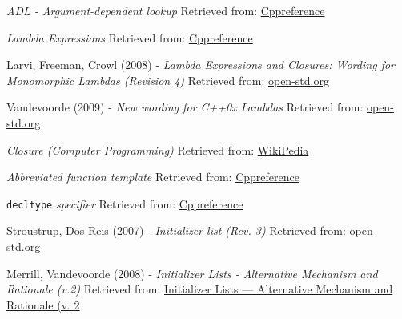     \emph{ADL - Argument-dependent lookup}
    \newline
    Retrieved from: \href{https://en.cppreference.com/w/cpp/language/adl}{Cppreference}

    \emph{Lambda Expressions}
    \newline
    Retrieved from: \href{https://en.cppreference.com/w/cpp/language/lambda}{Cppreference}
    
    Larvi, Freeman, Crowl (2008) - \emph{Lambda Expressions and Closures: Wording for Monomorphic Lambdas (Revision 4)}
    \newline
    Retrieved from: \href{https://www.open-std.org/jtc1/sc22/wg21/docs/papers/2008/n2550.pdf}{open-std.org}

    Vandevoorde (2009) - \emph{New wording for C++0x Lambdas}
    \newline
    Retrieved from: \href{https://www.open-std.org/jtc1/sc22/wg21/docs/papers/2009/n2859.pdf}{open-std.org}      
    
    \emph{Closure (Computer Programming)}
    \newline
    Retrieved from: \href{https://en.wikipedia.org/wiki/Closure_(computer_programming)}{WikiPedia}

    \emph{Abbreviated function template}
    \newline
    Retrieved from: \href{https://en.cppreference.com/w/cpp/language/function_template#Abbreviated_function_template}{Cppreference}

    \texttt{decltype} \emph{specifier}
    \newline
    Retrieved from: \href{https://en.cppreference.com/w/cpp/language/decltype}{Cppreference}

    Stroustrup, Dos Reis (2007) - \emph{Initializer list (Rev. 3)}
    \newline
    Retrieved from: \href{https://www.open-std.org/jtc1/sc22/wg21/docs/papers/2007/n2215.pdf}{open-std.org}
    
    Merrill, Vandevoorde (2008) - \emph{Initializer Lists - Alternative Mechanism and Rationale (v.2)}
    \newline
    Retrieved from: \href{https://www.open-std.org/jtc1/sc22/wg21/docs/papers/2008/n2640.pdf}{Initializer Lists — Alternative Mechanism and Rationale (v. 2}
    

